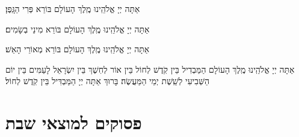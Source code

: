 \documentclass[twoside, openany, parskip=half, 11pt]{book}
\begin{document}
\savri
{}
אַתָּה יְיָ אֱלֹהֵֽינוּ מֶֽלֶךְ הָעוֹלָם בּוֹרֵא פְּרִי הַגָּֽפֶן׃

אַתָּה יְיָ אֱלֹהֵֽינוּ מֶֽלֶךְ הָעוֹלָם בּוֹרֵא מִינֵי בְשָׂמִים׃

אַתָּה יְיָ אֱלֹהֵֽינוּ מֶֽלֶךְ הָעוֹלָם בּוֹרֵא מְאוֹרֵי הָאֵשׁ׃

אַתָּה יְיָ אֱלֹהֵֽינוּ מֶֽלֶךְ הָעוֹלָם הַמַּבְדִיל בֵּין קֹֽדֶשׁ לְחוֹל בֵּין אוֹר לְחֽשֶׁךְ בֵּין יִשְׂרָאֵל לָעַמִּים בֵּין יוֹם הַשְּׁבִיעִי לְשֵֽׁשֶׁת יְמֵי הַמַּעֲשֶׂה׃ בָּרוּךְ אַתָּה יְיָ הַמַּבְדִּיל בֵּין קֹֽדֶשׁ לְחוֹל׃

\section[פסוקים למוצ״ש]{ פסוקים למוצאי שבת }

\end{document}

